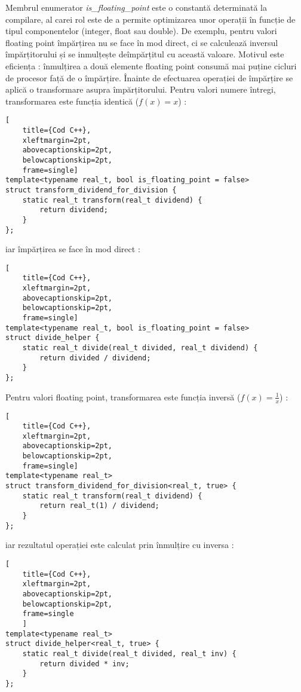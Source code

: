 Membrul enumerator \textit{is\_floating\_point} este o constantă determinată la
compilare, al carei rol este de a permite optimizarea unor operații în funcție
de tipul componentelor (integer, float sau double). De exemplu, pentru valori
floating point împărțirea nu se face în mod direct, ci se calculează inversul
împărțitorului și se inmulțește deîmpărțitul cu această valoare.
Motivul este eficiența : înmulțirea a două elemente floating point consumă mai puține
cicluri de procesor față de o împărțire. Înainte de efectuarea operației de
împărțire se aplică o transformare asupra împărțitorului. Pentru valori numere
întregi, transformarea este funcția identică ($f(x) = x$) :
\begin{lstlisting}[
    title={Cod C++}, 
    xleftmargin=2pt,
    abovecaptionskip=2pt,
    belowcaptionskip=2pt,
    frame=single]
template<typename real_t, bool is_floating_point = false>
struct transform_dividend_for_division {
    static real_t transform(real_t dividend) {
        return dividend;
    }
};
\end{lstlisting} iar împărțirea se face în mod direct :
\begin{lstlisting}[
    title={Cod C++}, 
    xleftmargin=2pt,
    abovecaptionskip=2pt,
    belowcaptionskip=2pt,
    frame=single]
template<typename real_t, bool is_floating_point = false>
struct divide_helper {
    static real_t divide(real_t divided, real_t dividend) {
        return divided / dividend;
    }
};
\end{lstlisting}

Pentru valori floating point, transformarea este funcția inversă
($f(x) = \frac{1}{x}$) :
\begin{lstlisting}[
    title={Cod C++}, 
    xleftmargin=2pt,
    abovecaptionskip=2pt,
    belowcaptionskip=2pt,
    frame=single]
template<typename real_t>
struct transform_dividend_for_division<real_t, true> {
    static real_t transform(real_t dividend) {
        return real_t(1) / dividend;
    }
};
\end{lstlisting} iar rezultatul operației este calculat prin înmulțire cu inversa :
\begin{lstlisting}[
    title={Cod C++}, 
    xleftmargin=2pt,
    abovecaptionskip=2pt,
    belowcaptionskip=2pt,
    frame=single
    ]
template<typename real_t>
struct divide_helper<real_t, true> {
    static real_t divide(real_t divided, real_t inv) {
        return divided * inv;
    }
};
\end{lstlisting}

